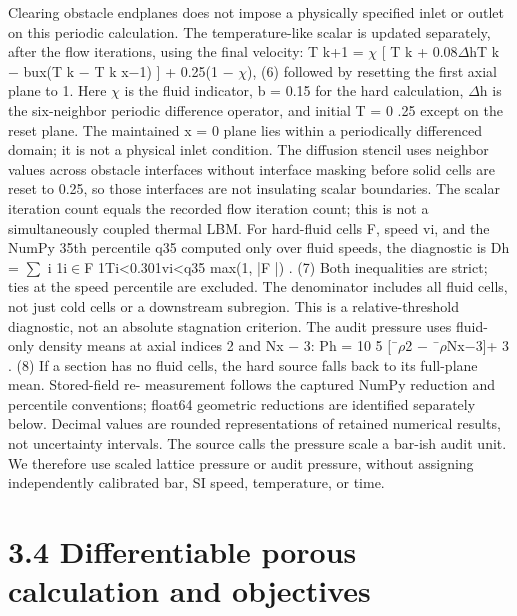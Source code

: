 \documentclass[11pt]{article}
\begin{document}
Clearing obstacle endplanes does not impose a physically specified inlet or outlet on this periodic
calculation. The temperature-like scalar is updated separately, after the flow iterations, using the
final velocity:
T k+1 = \ensuremath{\chi}
[
T k + 0.08\ensuremath{\Delta}hT k \ensuremath{-} bux(T k \ensuremath{-} T k
x\ensuremath{-}1)
]
+ 0.25(1 \ensuremath{-} \ensuremath{\chi}), (6)
followed by resetting the first axial plane to 1. Here \ensuremath{\chi} is the fluid indicator, b = 0.15 for the hard
calculation, \ensuremath{\Delta}h is the six-neighbor periodic difference operator, and initial T = 0 .25 except on
the reset plane. The maintained x = 0 plane lies within a periodically differenced domain; it is
not a physical inlet condition. The diffusion stencil uses neighbor values across obstacle interfaces
without interface masking before solid cells are reset to 0.25, so those interfaces are not insulating
scalar boundaries. The scalar iteration count equals the recorded flow iteration count; this is not a
simultaneously coupled thermal LBM.
For hard-fluid cells F, speed vi, and the NumPy 35th percentile q35 computed only over fluid
speeds, the diagnostic is
Dh =
\ensuremath{\sum}
i 1i\ensuremath{\in}F 1Ti<0.301vi<q35
max(1, |F |) . (7)
Both inequalities are strict; ties at the speed percentile are excluded. The denominator includes all
fluid cells, not just cold cells or a downstream subregion. This is a relative-threshold diagnostic,
not an absolute stagnation criterion.
The audit pressure uses fluid-only density means at axial indices 2 and Nx \ensuremath{-} 3:
Ph = 10 5 [¯\ensuremath{\rho}2 \ensuremath{-} ¯\ensuremath{\rho}Nx\ensuremath{-}3]+
3 . (8)
If a section has no fluid cells, the hard source falls back to its full-plane mean. Stored-field re-
measurement follows the captured NumPy reduction and percentile conventions; float64 geometric
reductions are identified separately below. Decimal values are rounded representations of retained
numerical results, not uncertainty intervals. The source calls the pressure scale a bar-ish audit
unit. We therefore use scaled lattice pressure or audit pressure, without assigning independently
calibrated bar, SI speed, temperature, or time.

\section*{3.4 Differentiable porous calculation and objectives}
\end{document}
